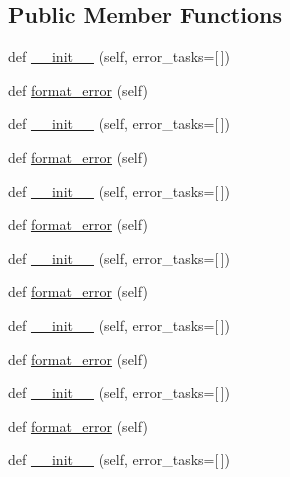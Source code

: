 \subsection*{Public Member Functions}
\begin{DoxyCompactItemize}
\item 
def \hyperlink{classwaflib_1_1_errors_1_1_build_error_aa294780921c40c9f8e6aa7ec10a19d30}{\+\_\+\+\_\+init\+\_\+\+\_\+} (self, error\+\_\+tasks=\mbox{[}$\,$\mbox{]})
\item 
def \hyperlink{classwaflib_1_1_errors_1_1_build_error_a086f7248444a2068a4df7a73a2450968}{format\+\_\+error} (self)
\item 
def \hyperlink{classwaflib_1_1_errors_1_1_build_error_aa294780921c40c9f8e6aa7ec10a19d30}{\+\_\+\+\_\+init\+\_\+\+\_\+} (self, error\+\_\+tasks=\mbox{[}$\,$\mbox{]})
\item 
def \hyperlink{classwaflib_1_1_errors_1_1_build_error_a086f7248444a2068a4df7a73a2450968}{format\+\_\+error} (self)
\item 
def \hyperlink{classwaflib_1_1_errors_1_1_build_error_aa294780921c40c9f8e6aa7ec10a19d30}{\+\_\+\+\_\+init\+\_\+\+\_\+} (self, error\+\_\+tasks=\mbox{[}$\,$\mbox{]})
\item 
def \hyperlink{classwaflib_1_1_errors_1_1_build_error_a086f7248444a2068a4df7a73a2450968}{format\+\_\+error} (self)
\item 
def \hyperlink{classwaflib_1_1_errors_1_1_build_error_aa294780921c40c9f8e6aa7ec10a19d30}{\+\_\+\+\_\+init\+\_\+\+\_\+} (self, error\+\_\+tasks=\mbox{[}$\,$\mbox{]})
\item 
def \hyperlink{classwaflib_1_1_errors_1_1_build_error_a086f7248444a2068a4df7a73a2450968}{format\+\_\+error} (self)
\item 
def \hyperlink{classwaflib_1_1_errors_1_1_build_error_aa294780921c40c9f8e6aa7ec10a19d30}{\+\_\+\+\_\+init\+\_\+\+\_\+} (self, error\+\_\+tasks=\mbox{[}$\,$\mbox{]})
\item 
def \hyperlink{classwaflib_1_1_errors_1_1_build_error_a086f7248444a2068a4df7a73a2450968}{format\+\_\+error} (self)
\item 
def \hyperlink{classwaflib_1_1_errors_1_1_build_error_aa294780921c40c9f8e6aa7ec10a19d30}{\+\_\+\+\_\+init\+\_\+\+\_\+} (self, error\+\_\+tasks=\mbox{[}$\,$\mbox{]})
\item 
def \hyperlink{classwaflib_1_1_errors_1_1_build_error_a086f7248444a2068a4df7a73a2450968}{format\+\_\+error} (self)
\item 
def \hyperlink{classwaflib_1_1_errors_1_1_build_error_aa294780921c40c9f8e6aa7ec10a19d30}{\+\_\+\+\_\+init\+\_\+\+\_\+} (self, error\+\_\+tasks=\mbox{[}$\,$\mbox{]})

\end{DoxyCompactItemize}
